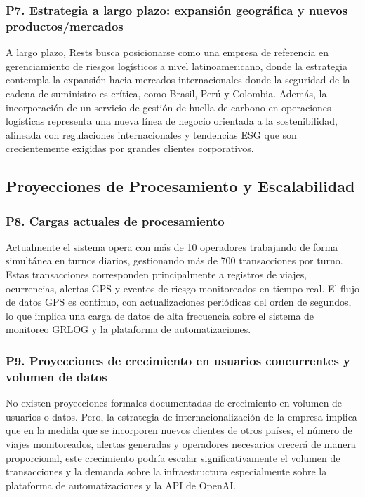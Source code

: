 \documentclass[12pt]{article}
\begin{document}
\subsubsection*{\textbf{P7. Estrategia a largo plazo: expansi\'on geogr\'afica y nuevos productos/mercados}}

A largo plazo, Rests busca posicionarse como una empresa de referencia en gerenciamiento de
riesgos log\'isticos a nivel latinoamericano, donde la estrategia contempla la expansi\'on hacia
mercados internacionales donde la seguridad de la cadena de suministro es cr\'itica, como
Brasil, Per\'u y Colombia. Además, la incorporaci\'on de un servicio de gesti\'on de
huella de carbono en operaciones log\'isticas representa una nueva l\'inea de negocio orientada
a la sostenibilidad, alineada con regulaciones internacionales y tendencias ESG que son
crecientemente exigidas por grandes clientes corporativos.

\subsection{Proyecciones de Procesamiento y Escalabilidad}

\subsubsection*{\textbf{P8. Cargas actuales de procesamiento}}

Actualmente el sistema opera con m\'as de 10 operadores trabajando de forma simult\'anea en
turnos diarios, gestionando m\'as de 700 transacciones por turno. Estas transacciones corresponden
principalmente a registros de viajes, ocurrencias, alertas GPS y eventos de riesgo monitoreados
en tiempo real. El flujo de datos GPS es continuo, con actualizaciones peri\'odicas del orden
de segundos, lo que implica una carga de datos de alta frecuencia sobre el sistema de monitoreo
GRLOG y la plataforma de automatizaciones.

\subsubsection*{\textbf{P9. Proyecciones de crecimiento en usuarios concurrentes y volumen de datos}}

No existen proyecciones formales documentadas de crecimiento en volumen de usuarios o datos.
Pero, la estrategia de internacionalizaci\'on de la empresa implica que en la medida
que se incorporen nuevos clientes de otros pa\'ises, el n\'umero de viajes monitoreados, alertas
generadas y operadores necesarios crecer\'a de manera proporcional, este crecimiento podr\'ia
escalar significativamente el volumen de transacciones y la demanda sobre la infraestructura especialmente sobre la plataforma de automatizaciones y la API de OpenAI.
\end{document}
